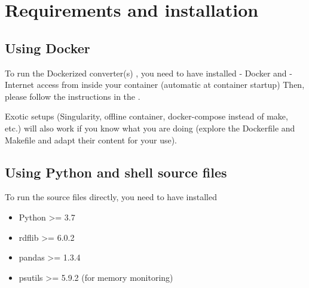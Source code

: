 \documentclass[letterpaper,10pt,english]{sphinxmanual}
\begin{document}
\chapter{Requirements and installation}
\label{\detokenize{index:requirements-and-installation}}

\section{Using Docker}
\label{\detokenize{index:using-docker}}


To run the Dockerized converter(s) , you need to have installed
- Docker and 
- Internet access from inside your container (automatic  at container startup)
Then, please follow the instructions in the {\hyperref[\detokenize{docker:docker}]{}}.

Exotic setups (Singularity, offline container, docker-compose instead of make, etc.) will also work if you know what you are doing (explore the Dockerfile and Makefile and adapt their content for your use).


\section{Using Python and shell source files}
\label{\detokenize{index:using-python-and-shell-source-files}}

To run the source files directly, you need to have installed
\begin{itemize}
\item {} 
Python \textgreater{}= 3.7

\item {} 
rdflib \textgreater{}= 6.0.2

\item {} 
pandas \textgreater{}= 1.3.4

\item {} 
psutils \textgreater{}= 5.9.2 (for memory monitoring)

\end{itemize}
\end{document}
